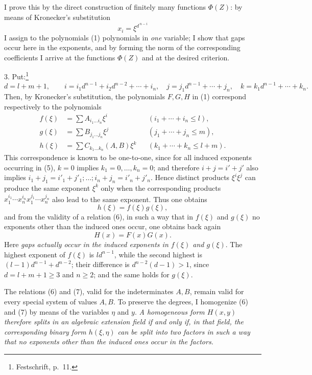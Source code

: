 \documentclass[11pt]{article}
\begin{document}
I prove this by the direct construction of finitely many functions $\Phi(Z)$: by means of Kronecker's substitution
\[
 x_i=\xi^{d^{\,n-i}}
\]
I assign to the polynomials (1) polynomials in \emph{one} variable; I show that gaps occur here in the exponents, and by forming the norm of the corresponding coefficients I arrive at the functions $\Phi(Z)$ and at the desired criterion.

3. Put:\footnote{Festschrift, p.~11.}
\begin{equation}
 d=l+m+1,\qquad
 i=i_1d^{n-1}+i_2d^{n-2}+\cdots+i_n,
\quad
 j=j_1d^{n-1}+\cdots+j_n,
\quad
 k=k_1d^{n-1}+\cdots+k_n.
\tag{4}
\end{equation}
Then, by Kronecker's substitution, the polynomials $F,G,H$ in (1) correspond respectively to the polynomials
\begin{equation}
\begin{aligned}
 f(\xi)&=\sum A_{i_1\ldots i_n}\xi^i &&(i_1+\cdots+i_n\le l),\\
 g(\xi)&=\sum B_{j_1\ldots j_n}\xi^j &&(j_1+\cdots+j_n\le m),\\
 h(\xi)&=\sum C_{k_1\ldots k_n}(A,B)\xi^k &&(k_1+\cdots+k_n\le l+m).
\end{aligned}
\tag{5}
\end{equation}
This correspondence is known to be one-to-one, since for all induced exponents occurring in (5), $k=0$ implies $k_1=0,\ldots,k_n=0$; and therefore $i+j=i'+j'$ also implies $i_1+j_1=i'_1+j'_1;\ldots;i_n+j_n=i'_n+j'_n$. Hence distinct products $\xi^i\xi^j$ can produce the same exponent $\xi^k$ only when the corresponding products $x_1^{i_1}\cdots x_n^{i_n}x_1^{j_1}\cdots x_n^{j_n}$ also lead to the same exponent. Thus one obtains
\begin{equation}
 h(\xi)=f(\xi)g(\xi),
\tag{6}
\end{equation}
and from the validity of a relation (6), in such a way that in $f(\xi)$ and $g(\xi)$ no exponents other than the induced ones occur, one obtains back again
\begin{equation}
 H(x)=F(x)G(x).
\tag{7}
\end{equation}
Here \emph{gaps actually occur in the induced exponents in $f(\xi)$ and $g(\xi)$}. The highest exponent of $f(\xi)$ is $ld^{n-1}$, while the second highest is $(l-1)d^{n-1}+d^{n-2}$; their difference is $d^{n-2}(d-1)>1$, since $d=l+m+1\ge3$ and $n\ge2$; and the same holds for $g(\xi)$.

The relations (6) and (7), valid for the indeterminates $A,B$, remain valid for every special system of values $A,B$. To preserve the degrees, I homogenize (6) and (7) by means of the variables $\eta$ and $y$. \emph{A homogeneous form $H(x,y)$ therefore splits in an algebraic extension field if and only if, in that field, the corresponding binary form $h(\xi,\eta)$ can be split into two factors in such a way that no exponents other than the induced ones occur in the factors.}
\end{document}
